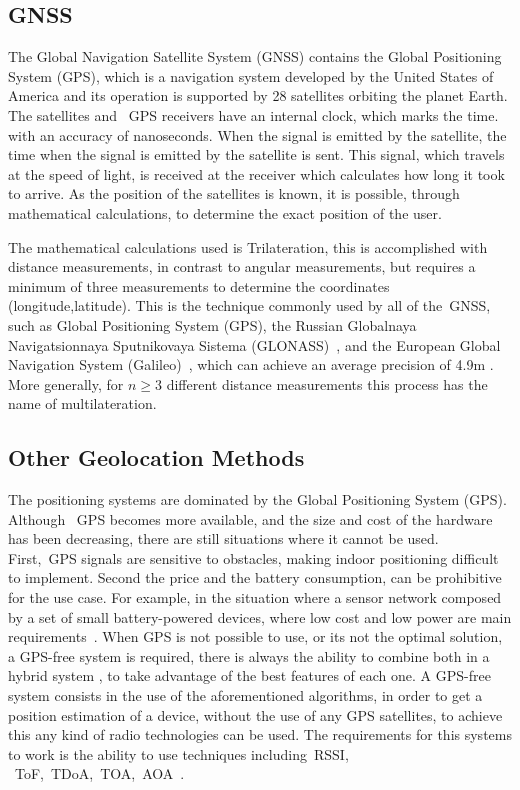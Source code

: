 \newpage
\subsection{GNSS} %
\label{sec:GNSS}


The Global Navigation Satellite System (\gls{GNSS}) contains the Global Positioning System (\gls{GPS}), which is a navigation system developed by the United States of America and its operation is supported by 28 satellites orbiting the planet Earth. The satellites and ~\gls{GPS} receivers have an internal clock, which marks the time. with an accuracy of nanoseconds. When the signal is emitted by the satellite, the time when the signal is emitted by the satellite is sent. This signal, which travels at the speed of light, is received at the receiver which calculates how long it took to arrive. As the position of the satellites is known, it is possible, through mathematical calculations, to determine the exact position of the user. 

The mathematical calculations used is Trilateration, this is  accomplished  with distance measurements, in contrast to angular measurements, but requires a minimum of three  measurements to determine the coordinates (longitude,latitude). This is the technique commonly used by all of the~\gls{GNSS}, such as Global Positioning System (\gls{GPS}), the Russian Globalnaya Navigatsionnaya Sputnikovaya Sistema (GLONASS)~\cite{Ivanov1992}, and the European Global Navigation System (Galileo)~\cite{Galileo}, which can achieve an average precision of 4.9m . More generally, for $n \geq 3$ different distance measurements this process has the name of multilateration.

\subsection{Other Geolocation Methods} %
\label{sec:other_Geolocation}

The positioning systems are dominated by the Global Positioning System (\gls{GPS}). Although ~\gls{GPS} becomes more available, and the size and cost of the hardware has been decreasing, there are still situations where it cannot be used. First,~\gls{GPS} signals are sensitive to obstacles, making indoor positioning difficult to implement. Second the price and the battery consumption, can be prohibitive for the use case. For example, in the situation where a sensor network composed by a set of small battery-powered devices, where low cost and low power are main requirements~\cite{GFBriilwdis2005}. When \gls{GPS} is not possible to use, or its not the optimal solution, a GPS-free system is required, there is always the ability to combine both in a hybrid system , to take advantage of the best features of each one.
A GPS-free system consists in the use of the aforementioned algorithms, in order to get a position estimation of a device, without the use of any \gls{GPS} satellites, to achieve this any kind of radio technologies can be used. The requirements for this systems to work is the ability to use techniques including~\gls{RSSI}, ~\gls{ToF},~\gls{TDoA},~\gls{TOA},~\gls{AOA}~\cite{GFZhu2010}.

